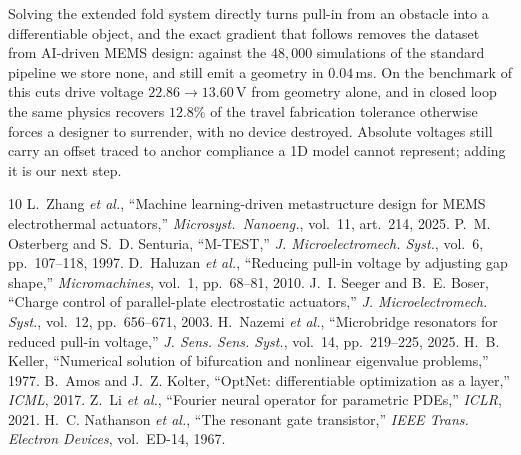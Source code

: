 \documentclass[conference,10pt]{IEEEtran}
\begin{document}
Solving the extended fold system directly turns pull-in from an obstacle into a
differentiable object, and the exact gradient that follows removes the dataset
from AI-driven MEMS design: against the $48{,}000$ simulations of the standard
pipeline \cite{zhang} we store none, and still emit a geometry in $0.04$\,ms.
On the benchmark of \cite{haluzan} this cuts drive voltage
$22.86\rightarrow13.60$\,V from geometry alone, and in closed loop the same
physics recovers $12.8\%$ of the travel fabrication tolerance otherwise forces
a designer to surrender, with no device destroyed. Absolute voltages still
carry an offset traced to anchor compliance a 1D model cannot represent; adding
it is our next step.


\begin{thebibliography}{10}\scriptsize
\setlength{\itemsep}{-2.4pt}\setlength{\parskip}{0pt}
\setlength{\itemindent}{0pt}
 L.~Zhang \emph{et al.}, ``Machine learning-driven metastructure
design for MEMS electrothermal actuators,'' \emph{Microsyst.\ Nanoeng.},
vol.~11, art.~214, 2025.
 P.~M. Osterberg and S.~D. Senturia, ``M-TEST,''
\emph{J. Microelectromech. Syst.}, vol.~6, pp.~107--118, 1997.
 D.~Haluzan \emph{et al.}, ``Reducing pull-in voltage by
adjusting gap shape,'' \emph{Micromachines}, vol.~1, pp.~68--81, 2010.
 J.~I. Seeger and B.~E. Boser, ``Charge control of
parallel-plate electrostatic actuators,'' \emph{J. Microelectromech. Syst.},
vol.~12, pp.~656--671, 2003.
 H.~Nazemi \emph{et al.}, ``Microbridge resonators for reduced
pull-in voltage,'' \emph{J. Sens. Sens. Syst.}, vol.~14, pp.~219--225, 2025.
 H.~B. Keller, ``Numerical solution of bifurcation and
nonlinear eigenvalue problems,'' 1977.
 B.~Amos and J.~Z. Kolter, ``OptNet: differentiable optimization
as a layer,'' \emph{ICML}, 2017.
 Z.~Li \emph{et al.}, ``Fourier neural operator for parametric
PDEs,'' \emph{ICLR}, 2021.
 H.~C. Nathanson \emph{et al.}, ``The resonant gate
transistor,'' \emph{IEEE Trans. Electron Devices}, vol.~ED-14, 1967.
\end{thebibliography}
\end{document}
